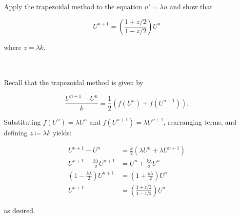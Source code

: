 Apply the trapezoidal method to the equation $u' = \lambda u$ and show that 

$$
    U^{n+1} = \left( \frac{1 + z/2}{1 - z/2} \right) U^n
$$

where $z = \lambda k$.

\begin{solution}\ \\\\
    Recall that the trapezoidal method is given by

    $$
    \frac{U^{n+1} - U^n}{k} = \frac{1}{2} \left( f(U^n) + f(U^{n+1}) \right). 
    $$

    Substituting $f(U^n) = \lambda U^n$ and $f(U^{n+1}) = \lambda U^{n+1}$, rearranging terms, and defining 
    $z \coloneqq \lambda k$ yields:

    \begin{align*}
        U^{n+1} - U^{n} &= \frac{k}{2} \left( \lambda U^n + \lambda U^{n+1} \right) \\
        U^{n+1} - \frac{k \lambda}{2} U^{n+1} &= U^n + \frac{k \lambda}{2} U^{n} \\
        \left(1 - \frac{k \lambda}{2} \right) U^{n+1}  &= \left(1 + \frac{k \lambda}{2} \right) U^{n} \\
        U^{n+1}  &= \left( \frac{1 + z/2}{1 - z/2} \right) U^{n}
    \end{align*}

    as desired.
    \ \\
\end{solution}